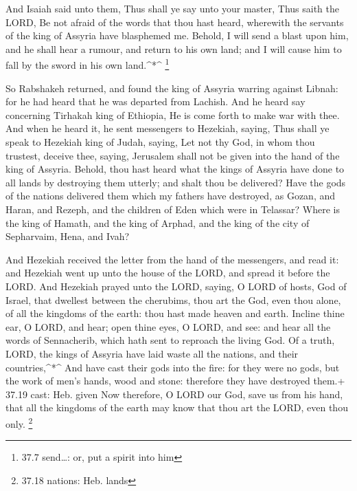  And Isaiah said unto them, Thus shall ye say unto your
master, Thus saith the LORD, Be not afraid of the words that thou hast
heard, wherewith the servants of the king of Assyria have blasphemed me.
 Behold, I will send a blast upon him, and he shall hear a
rumour, and return to his own land; and I will cause him to fall by the
sword in his own land.\^{}*\^{} \footnote{37.7 send\ldots: or, put a
  spirit into him}

 So Rabshakeh returned, and found the king of Assyria
warring against Libnah: for he had heard that he was departed from
Lachish.  And he heard say concerning Tirhakah king of
Ethiopia, He is come forth to make war with thee. And when he heard it,
he sent messengers to Hezekiah, saying,  Thus shall ye
speak to Hezekiah king of Judah, saying, Let not thy God, in whom thou
trustest, deceive thee, saying, Jerusalem shall not be given into the
hand of the king of Assyria.  Behold, thou hast heard what
the kings of Assyria have done to all lands by destroying them utterly;
and shalt thou be delivered?  Have the gods of the nations
delivered them which my fathers have destroyed, as Gozan, and Haran, and
Rezeph, and the children of Eden which were in Telassar? 
Where is the king of Hamath, and the king of Arphad, and the king of the
city of Sepharvaim, Hena, and Ivah?

 And Hezekiah received the letter from the hand of the
messengers, and read it: and Hezekiah went up unto the house of the
LORD, and spread it before the LORD.  And Hezekiah prayed
unto the LORD, saying,  O LORD of hosts, God of Israel,
that dwellest between the cherubims, thou art the God, even thou alone,
of all the kingdoms of the earth: thou hast made heaven and earth.
 Incline thine ear, O LORD, and hear; open thine eyes, O
LORD, and see: and hear all the words of Sennacherib, which hath sent to
reproach the living God.  Of a truth, LORD, the kings of
Assyria have laid waste all the nations, and their countries,\^{}*\^{}
 And have cast their gods into the fire: for they were no
gods, but the work of men's hands, wood and stone: therefore they have
destroyed them.+ 37.19 cast: Heb. given  Now therefore, O
LORD our God, save us from his hand, that all the kingdoms of the earth
may know that thou art the LORD, even thou only. \footnote{37.18
  nations: Heb. lands}


